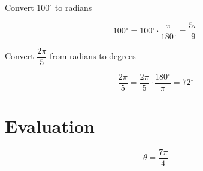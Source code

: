 \documentclass[fleqn,addpoints]{exam}
\newcommand{\degree}{\ensuremath{^\circ}}
\begin{document}
\begin{questions}

\question[3]
Convert $100 \degree$ to radians
\begin{solution}[4 cm]
\[
  100 \degree = 100 \degree \cdot \frac{\pi}{180\degree} = \frac{5 \pi}{9}
\]
\end{solution}

\question[3]
Convert $\dfrac{2 \pi}{5}$ from radians to degrees
\begin{solution}[4 cm]
\[
  \frac{2 \pi}{5} = \frac{2 \pi}{5} \cdot \frac{180 \degree}{\pi} = 72 \degree
\]
\end{solution}

\ifprintanswers
\else
\pagebreak
\fi

\section{Evaluation}

\question
\[
  \theta = \dfrac{7 \pi}{4}
\]

\end{questions}
\end{document}
